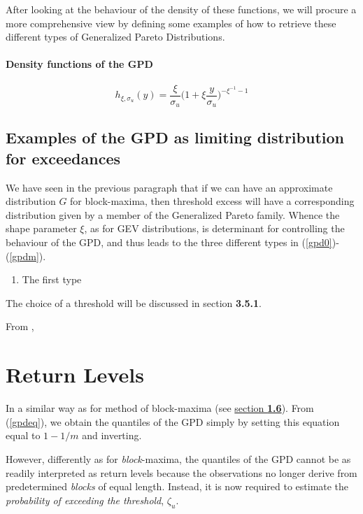 \documentclass[11pt,a4paper,openany ]{book}
\begin{document}
After looking at the behaviour of the density of these functions, we will procure a more comprehensive view by defining some examples of how to retrieve these different types of Generalized Pareto Distributions.

\paragraph*{Density functions of the GPD  }


\begin{equation}\label{densgpd}
h_{\xi,\sigma_u}(y)=\frac{\xi}{\sigma_u}\bigg(1+\xi\frac{y}{\sigma_u}\bigg)^{-\xi^{-1}-1}
\end{equation}



\subsection{Examples of the GPD as limiting distribution for exceedances }
We have seen in the previous paragraph that if we can have an approximate distribution $G$ for block-maxima, then threshold excess will have a corresponding distribution given by a member of the Generalized Pareto family. Whence the shape parameter $\xi$, as for GEV distributions, is determinant for controlling the behaviour of the
GPD, and thus leads to the three different types in (\ref{gpd0})-(\ref{gpdm}). 

\begin{enumerate}
	\item The first type 
	
\end{enumerate}



The choice of a threshold will be discussed in section \textbf{3.5.1}.

From \cite[p.147-]{beirlant_statistics_2006},


\section{Return Levels}

In a similar way as for method of block-maxima (see \hyperref[rlgev]{section \textbf{1.6}}).
From (\ref{gpdeq}), we obtain the quantiles of the GPD simply by setting this equation equal to $1-1/m$ and inverting.

However, differently as for \emph{block}-maxima, the quantiles of the GPD cannot be as readily interpreted as return levels because the observations no longer derive from predetermined \emph{blocks} of equal length. Instead, it is now required to estimate the \emph{probability of exceeding the threshold}, $\zeta_u$.
\end{document}
